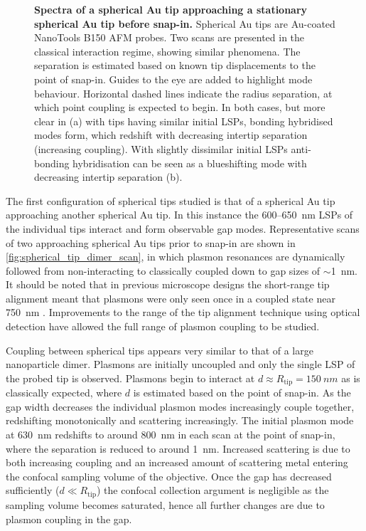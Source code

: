 \documentclass[a4paper]{article}
\begin{document}
\begin{figure}[bt]
\caption[Spectra of a spherical Au tip approaching a stationary spherical Au tip before snap-in]{\textbf{Spectra of a spherical Au tip approaching a stationary spherical Au tip before snap-in.} Spherical Au tips are Au-coated NanoTools B150 AFM probes. Two scans are presented in the classical interaction regime, showing similar phenomena. The separation is estimated based on known tip displacements to the point of snap-in. Guides to the eye are added to highlight mode behaviour. Horizontal dashed lines indicate the radius separation, at which point coupling is expected to begin. In both cases, but more clear in (a) with tips having similar initial LSPs, bonding hybridised modes form, which redshift with decreasing intertip separation (increasing coupling). With slightly dissimilar initial LSPs anti-bonding hybridisation can be seen as a blueshifting mode with decreasing intertip separation (b).}
\label{fig:spherical_tip_dimer_scan}
\end{figure}

The first configuration of spherical tips studied is that of a spherical Au tip approaching another spherical Au tip. In this instance the 600--\SI{650}{nm} LSPs of the individual tips interact and form observable gap modes. Representative scans of two approaching spherical Au tips prior to snap-in are shown in \autoref{fig:spherical_tip_dimer_scan}, in which plasmon resonances are dynamically followed from non-interacting to classically coupled down to gap sizes of $\sim$\SI{1}{nm}. It should be noted that in previous microscope designs the short-range tip alignment meant that plasmons were only seen once in a coupled state near \SI{750}{nm} \cite{savage2012}. Improvements to the range of the tip alignment technique using optical detection have allowed the full range of plasmon coupling to be studied.

Coupling between spherical tips appears very similar to that of a large nanoparticle dimer. Plasmons are initially uncoupled and only the single LSP of the probed tip is observed. Plasmons begin to interact at $d \approx R_{\mathrm{tip}} = \SI{150}{nm}$ as is classically expected, where $d$ is estimated based on the point of snap-in. As the gap width decreases the individual plasmon modes increasingly couple together, redshifting monotonically and scattering increasingly. The initial plasmon mode at \SI{630}{nm} redshifts to around \SI{800}{nm} in each scan at the point of snap-in, where the separation is reduced to around \SI{1}{nm}. Increased scattering is due to both increasing coupling and an increased amount of scattering metal entering the confocal sampling volume of the objective. Once the gap has decreased sufficiently ($d \ll R_{\mathrm{tip}}$) the confocal collection argument is negligible as the sampling volume becomes saturated, hence all further changes are due to plasmon coupling in the gap.
\end{document}
